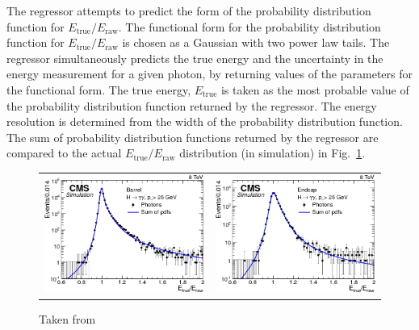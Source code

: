 The regressor attempts to predict the form of the probability distribution function for $E_{\text{true}}/E_{\text{raw}}$.
The functional form for the probability distribution function for $E_{\text{true}}/E_{\text{raw}}$ is chosen as a Gaussian with two power law tails.
The regressor simultaneously predicts the true energy and the uncertainty in the energy measurement for a given photon, by returning values of the parameters for the functional form.
The true energy, $E_{\text{true}}$ is taken as the most probable value of the probability distribution function returned by the regressor.
The energy resolution is determined from the width of the probability distribution function. 
The sum of probability distribution functions returned by the regressor are compared to the actual $E_{\text{true}}/E_{\text{raw}}$ distribution (in simulation) in Fig.~\ref{fig:photon_energy_regression}.
\begin{figure} [h!]
    \centering 
    \begin{tabular}{c c}
        \includegraphics[width=0.48\linewidth]{figures/event_reconstruction_and_selection/figs_recoenergy_Fig-2a.png} &
        \includegraphics[width=0.48\linewidth]{figures/event_reconstruction_and_selection/figs_recoenergy_Fig-2b.png}
    \end{tabular}
    \caption{Taken from~\cite{Khachatryan:2015iwa}}
    \label{fig:photon_energy_regression}
\end{figure}

